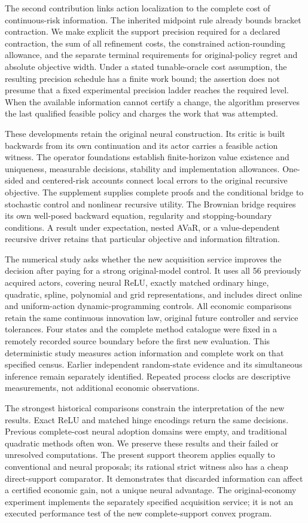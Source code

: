 The second contribution links action localization to the complete cost of
continuous-risk information. The inherited midpoint rule already bounds
bracket contraction. We make explicit the support precision required for a
declared contraction, the sum of all refinement costs, the constrained
action-rounding allowance, and the separate terminal requirements for
original-policy regret and absolute objective width. Under a stated
tunable-oracle cost assumption, the resulting precision schedule has a
finite work bound; the assertion does not presume that a fixed experimental
precision ladder reaches the required level. When the available information
cannot certify a change, the algorithm preserves the last qualified feasible
policy and charges the work that was attempted.

These developments retain the original neural construction. Its critic is
built backwards from its own continuation and its actor carries a feasible
action witness. The operator foundations establish finite-horizon value
existence and uniqueness, measurable decisions, stability and implementation
allowances. One-sided and centered-risk accounts connect local errors to the
original recursive objective. The supplement supplies complete proofs and
the conditional bridge to stochastic control and nonlinear recursive
utility. The Brownian bridge requires its own well-posed backward equation,
regularity and stopping-boundary conditions. A result under expectation,
nested AVaR, or a value-dependent recursive driver retains that particular
objective and information filtration.

The numerical study asks whether the new acquisition service improves the
decision after paying for a strong original-model control. It uses all
56 previously acquired actors, covering neural ReLU, exactly matched
ordinary hinge, quadratic, spline, polynomial and grid representations,
and includes direct online and uniform-action dynamic-programming controls.
All economic comparisons retain the same continuous innovation law,
original future controller and service tolerances. Four states and the
complete method catalogue were fixed in a remotely recorded source
boundary before the first new evaluation. This deterministic study measures
action information and complete work on that specified census. Earlier
independent random-state evidence and its simultaneous inference remain
separately identified. Repeated process clocks are descriptive measurements,
not additional economic observations.

The strongest historical comparisons constrain the interpretation of the
new results. Exact ReLU and matched hinge encodings return the same
decisions. Previous complete-cost neural adoption domains were empty, and
traditional quadratic methods often won. We preserve these results and
their failed or unresolved computations. The present support theorem
applies equally to conventional and neural proposals; its rational strict
witness also has a cheap direct-support comparator. It demonstrates that
discarded information can affect a certified economic gain, not a unique
neural advantage. The original-economy experiment implements the separately
specified acquisition service; it is not an executed performance test of
the new complete-support convex program.


